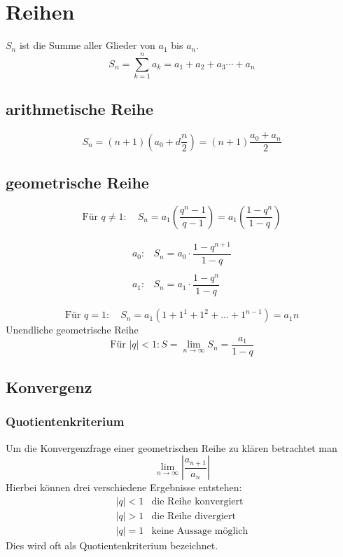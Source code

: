 \section{Reihen}
$S_n$ ist die Summe aller Glieder von $a_1$ bis $a_n$. 
\[ \boxed{S_n = \sum_{k=1}^{n} a_k = a_1 + a_2 + a_3 \cdots + a_n} \]

\subsection{arithmetische Reihe}
\[ \boxed{S_n = \left(n + 1\right)\left(a_0 + d \frac{n}{2}\right) = \left(n + 1\right) \frac{a_0 + a_n}{2}} \]

\subsection{geometrische Reihe}
\[ \boxed{\text{Für } q \neq 1: \quad S_n = a_1 \left(  \frac{q^n - 1}{q - 1} \right) = a_1 \left(  \frac{1 - q^n}{1 - q} \right)} \]

\[ \boxed{\begin{array}{ll}
a_0 :& S_n = a_0 \cdot \dfrac{1-q^{n+1}}{1-q} \\ 
& \\
a_1 :& S_n = a_1 \cdot \dfrac{1-q^n}{1-q}
\end{array}} \]

\[ \boxed{\text{Für } q = 1: \quad S_n = a_1 \left(1+1^1 + 1^2 + \ldots + 1^{n-1}\right) = a_1 n} \]
Unendliche geometrische Reihe
\[ \boxed{\text{Für } |q| < 1: S = \lim_{n \rightarrow \infty} S_n = \frac{a_1}{1 - q}} \] 

\subsection{Konvergenz}

\subsubsection*{Quotientenkriterium}
Um die Konvergenzfrage einer geometrischen Reihe zu klären betrachtet man
\[ \lim\limits_{n \rightarrow \infty} \left| \frac{a_{n+1}}{a_n} \right| \]
Hierbei können drei verschiedene Ergebnisse entstehen:
\[ \boxed{\begin{array}{ll}
|q| < 1 & \text{die Reihe konvergiert} \\
|q| > 1 & \text{die Reihe divergiert} \\
|q| = 1 & \text{keine Aussage möglich}
\end{array}} \]
Dies wird oft als Quotientenkriterium bezeichnet.

